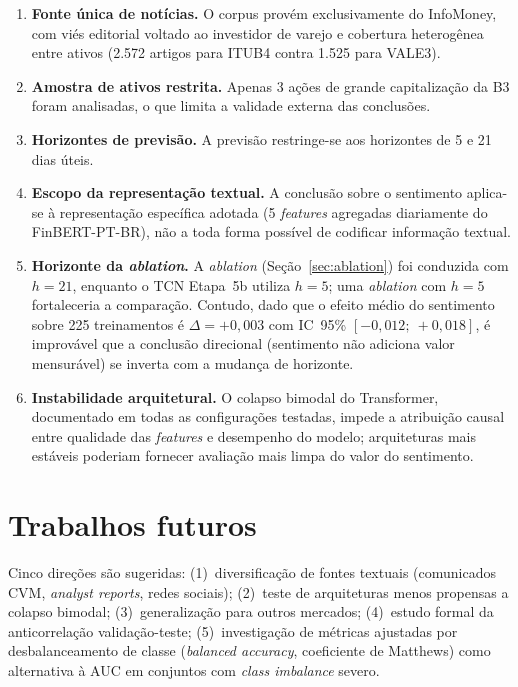 \begin{enumerate}
    \item \textbf{Fonte única de notícias.} O corpus provém exclusivamente do InfoMoney, com viés editorial voltado ao investidor de varejo e cobertura heterogênea entre ativos (2.572 artigos para ITUB4 contra 1.525 para VALE3).

    \item \textbf{Amostra de ativos restrita.} Apenas 3 ações de grande capitalização da B3 foram analisadas, o que limita a validade externa das conclusões.

    \item \textbf{Horizontes de previsão.} A previsão restringe-se aos horizontes de 5 e 21 dias úteis.

    \item \textbf{Escopo da representação textual.} A conclusão sobre o sentimento aplica-se à representação específica adotada (5 \textit{features} agregadas diariamente do FinBERT-PT-BR), não a toda forma possível de codificar informação textual.

    \item \textbf{Horizonte da \textit{ablation}.} A \textit{ablation} (Seção~\ref{sec:ablation}) foi conduzida com $h=21$, enquanto o TCN Etapa~5b utiliza $h=5$; uma \textit{ablation} com $h=5$ fortaleceria a comparação. Contudo, dado que o efeito médio do sentimento sobre 225 treinamentos é $\Delta = +0{,}003$ com IC~95\% $[-0{,}012;\ +0{,}018]$, é improvável que a conclusão direcional (sentimento não adiciona valor mensurável) se inverta com a mudança de horizonte.

    \item \textbf{Instabilidade arquitetural.} O colapso bimodal do Transformer, documentado em todas as configurações testadas, impede a atribuição causal entre qualidade das \textit{features} e desempenho do modelo; arquiteturas mais estáveis poderiam fornecer avaliação mais limpa do valor do sentimento.
\end{enumerate}

\section{Trabalhos futuros}

Cinco direções são sugeridas: (1)~diversificação de fontes textuais (comunicados CVM, \textit{analyst reports}, redes sociais); (2)~teste de arquiteturas menos propensas a colapso bimodal; (3)~generalização para outros mercados; (4)~estudo formal da anticorrelação validação-teste; (5)~investigação de métricas ajustadas por desbalanceamento de classe (\textit{balanced accuracy}, coeficiente de Matthews) como alternativa à AUC em conjuntos com \textit{class imbalance} severo.

